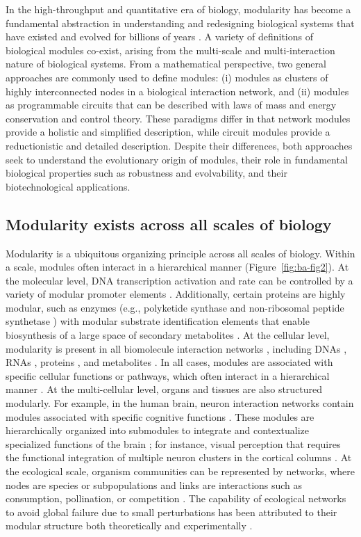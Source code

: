 In the high-throughput and quantitative era of biology, modularity has become a fundamental abstraction in understanding and redesigning biological systems that have existed and evolved for billions of years \citep{hartwell1999, wagner2007}.
A variety of definitions of biological modules co-exist, arising from the multi-scale and multi-interaction nature of biological systems.
From a mathematical perspective, two general approaches are commonly used to define modules: (i) modules as clusters of highly interconnected nodes in a biological interaction network, and (ii) modules as programmable circuits that can be described with laws of mass and energy conservation and control theory.
These paradigms differ in that network modules provide a holistic and simplified description, while circuit modules provide a reductionistic and detailed description.
Despite their differences, both approaches seek to understand the evolutionary origin of modules, their role in fundamental biological properties such as robustness and evolvability, and their biotechnological applications.

\subsection{Modularity exists across all scales of biology}

Modularity is a ubiquitous organizing principle across all scales of biology.
Within a scale, modules often interact in a hierarchical manner (Figure~\ref{fig:ba-fig2}).
At the molecular level, DNA transcription activation and rate can be controlled by a variety of modular promoter elements \citep{dynan1989}.
Additionally, certain proteins are highly modular, such as enzymes (e.g., polyketide synthase and non-ribosomal peptide synthetase \citep{hutchinson2003}) with modular substrate identification elements that enable biosynthesis of a large space of secondary metabolites \citep{khosla2001}.
At the cellular level, modularity is present in all biomolecule interaction networks \citep{mitra2013}, including DNAs \citep{wagner2001}, RNAs \citep{stuart2003}, proteins \citep{spirin2003}, and metabolites \citep{ravasz2002}.
In all cases, modules are associated with specific cellular functions or pathways, which often interact in a hierarchical manner \citep{ravasz2002}.
At the multi-cellular level, organs and tissues are also structured modularly.
For example, in the human brain, neuron interaction networks contain modules associated with specific cognitive functions \citep{sporns2016}.
These modules are hierarchically organized into submodules to integrate and contextualize specialized functions of the brain \citep{meunier2010}; for instance, visual perception that requires the functional integration of multiple neuron clusters in the cortical columns \citep{park2013}.
At the ecological scale, organism communities can be represented by networks, where nodes are species or subpopulations and links are interactions such as consumption, pollination, or competition \citep{grilli2016}.
The capability of ecological networks to avoid global failure due to small perturbations has been attributed to their modular structure both theoretically \citep{grilli2016} and experimentally \citep{gilarranz2017}.

